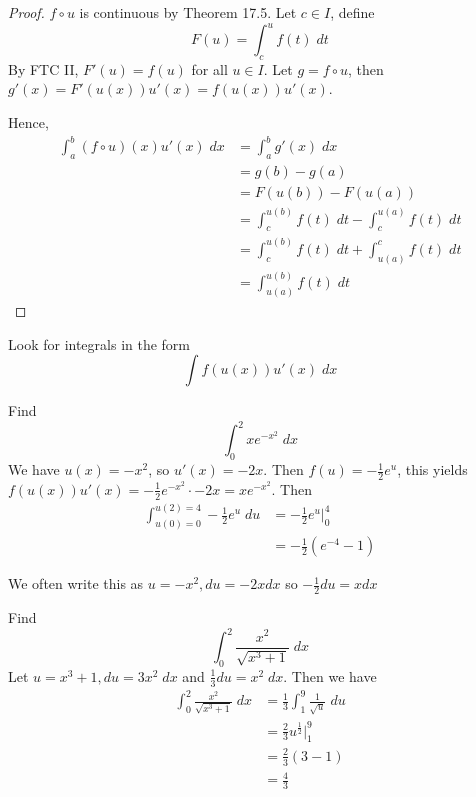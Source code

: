 \documentclass{article}
\begin{document}
  \begin{proof}
    $f \circ u$ is continuous by Theorem 17.5. Let $c \in I$, define \[
      F(u) = \int_c^u f(t) \; dt
    \]
    By FTC II, $F'(u) = f(u)$ for all $u \in I$. Let $g = f \circ u $, then $g'(x) = F'(u(x))u'(x) = f(u(x))u'(x)$.

    Hence,
    \begin{align*}
      \int_a^b (f \circ u)(x) u'(x) \; dx &= \int_a^b g'(x) \; dx\\
      &= g(b) - g(a)\\
      &= F(u(b)) - F(u(a))\\
      &= \int_c^{u(b)} f(t) \; dt - \int_c^{u(a)} f(t) \; dt \\
      &= \int_c^{u(b)} f(t) \; dt + \int_{u(a)}^c f(t) \; dt \\
      &= \int_{u(a)}^{u(b)} f(t) \; dt
    \end{align*}
  \end{proof}
  \begin{remark}
    Look for integrals in the form \[
      \int f(u(x)) u'(x) \; dx
    \]
  \end{remark}
  \begin{example}
    Find \[
      \int_0^2 xe^{-x^2} \; dx
    \]
    We have $u(x) = -x^2$, so $u'(x) = -2x$. Then $f(u) = -\frac{1}{2}e^u$, this yields $f(u(x)) u'(x) = -\frac{1}{2}e^{-x^2} \cdot -2x = xe^{-x^2}$. Then
    \begin{align*}
      \int_{u(0) = 0}^{u(2) = 4} -\frac{1}{2}e^u \; du &= -\frac{1}{2}e^u\Big|_0^4\\
      &= -\frac{1}{2}(e^{-4}-1)
    \end{align*}

    We often write this as $u = -x^2, du = -2xdx$ so $-\frac{1}{2}du = xdx$
  \end{example}
  \begin{example}
    Find \[
      \int_0^2 \frac{x^2}{\sqrt{x^3 + 1}} \; dx
    \]
    Let $u = x^3 + 1, du = 3x^2 \; dx$ and $\frac{1}{3}du = x^2 \; dx$.
    Then we have
    \begin{align*}
      \int_0^2 \frac{x^2}{\sqrt{x^3 + 1}} \; dx &= \frac{1}{3}\int_1^9 \frac{1}{\sqrt{u}} \; du\\
      &= \frac{2}{3}u^{\frac{1}{2}}\Big|_1^9\\
      &= \frac{2}{3}(3-1)\\
      &= \frac{4}{3}\\
    \end{align*}
  \end{example}
\end{document}
